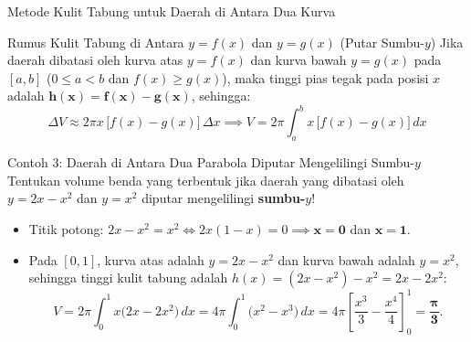 \documentclass[aspectratio=43,10pt]{beamer}
\begin{document}
\begin{frame}{Metode Kulit Tabung untuk Daerah di Antara Dua Kurva}
    \begin{block}{Rumus Kulit Tabung di Antara $y = f(x)$ dan $y = g(x)$ (Putar Sumbu-$y$)}
        \scriptsize\abovedisplayskip=2pt\belowdisplayskip=2pt
        Jika daerah dibatasi oleh kurva atas $y = f(x)$ dan kurva bawah $y = g(x)$ pada $[a, b]$ ($0 \le a < b$ dan $f(x) \ge g(x)$), maka tinggi pias tegak pada posisi $x$ adalah $\mathbf{h(x) = f(x) - g(x)}$, sehingga:
        $$\boxed{\;\Delta V \approx 2\pi x\,\big[f(x) - g(x)\big]\,\Delta x \implies V = 2\pi\int_{a}^{b} x\,\big[f(x) - g(x)\big]\,dx\;}$$
    \end{block}

    \begin{exampleblock}{Contoh 3: Daerah di Antara Dua Parabola Diputar Mengelilingi Sumbu-$y$}
        \scriptsize\abovedisplayskip=2pt\belowdisplayskip=2pt
        Tentukan volume benda yang terbentuk jika daerah yang dibatasi oleh $y = 2x - x^2$ dan $y = x^2$ diputar mengelilingi \textbf{sumbu-$y$}!
        \begin{itemize}\itemsep=1pt
            \item Titik potong: $2x - x^2 = x^2 \iff 2x(1 - x) = 0 \implies \mathbf{x = 0}$ dan $\mathbf{x = 1}$.
            \item Pada $[0, 1]$, kurva atas adalah $y = 2x - x^2$ dan kurva bawah adalah $y = x^2$, sehingga tinggi kulit tabung adalah $h(x) = (2x - x^2) - x^2 = 2x - 2x^2$:
            $$V = 2\pi\int_{0}^{1} x\big(2x - 2x^2\big)\,dx = 4\pi\int_{0}^{1} \big(x^2 - x^3\big)\,dx = 4\pi\left[\frac{x^3}{3} - \frac{x^4}{4}\right]_{0}^{1} = \mathbf{\frac{\pi}{3}}.$$
        \end{itemize}
    \end{exampleblock}
\end{frame}
\end{document}
